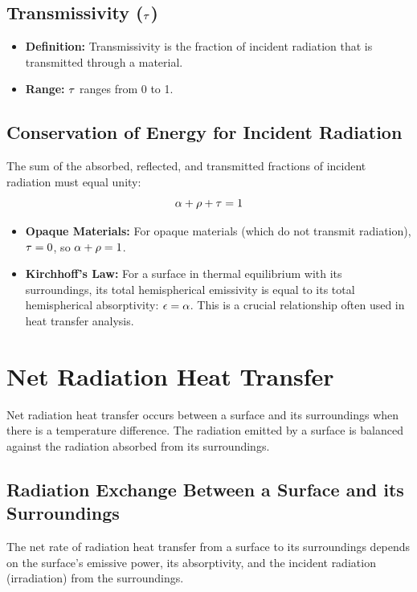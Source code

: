 \subsection{Transmissivity ($\tau$)}
\begin{itemize}
    \item \textbf{Definition:} Transmissivity is the fraction of incident radiation that is transmitted through a material.
    \item \textbf{Range:} $\tau$ ranges from 0 to 1.
\end{itemize}

\subsection{Conservation of Energy for Incident Radiation}
The sum of the absorbed, reflected, and transmitted fractions of incident radiation must equal unity:
\begin{equation}
    \alpha + \rho + \tau = 1
\end{equation}
\begin{itemize}
    \item \textbf{Opaque Materials:} For opaque materials (which do not transmit radiation), $\tau = 0$, so $\alpha + \rho = 1$.
    \item \textbf{Kirchhoff's Law:} For a surface in thermal equilibrium with its surroundings, its total hemispherical emissivity is equal to its total hemispherical absorptivity: $\epsilon = \alpha$. This is a crucial relationship often used in heat transfer analysis.
\end{itemize}

\section{Net Radiation Heat Transfer}

Net radiation heat transfer occurs between a surface and its surroundings when there is a temperature difference. The radiation emitted by a surface is balanced against the radiation absorbed from its surroundings.

\subsection{Radiation Exchange Between a Surface and its Surroundings}
The net rate of radiation heat transfer from a surface to its surroundings depends on the surface's emissive power, its absorptivity, and the incident radiation (irradiation) from the surroundings.

